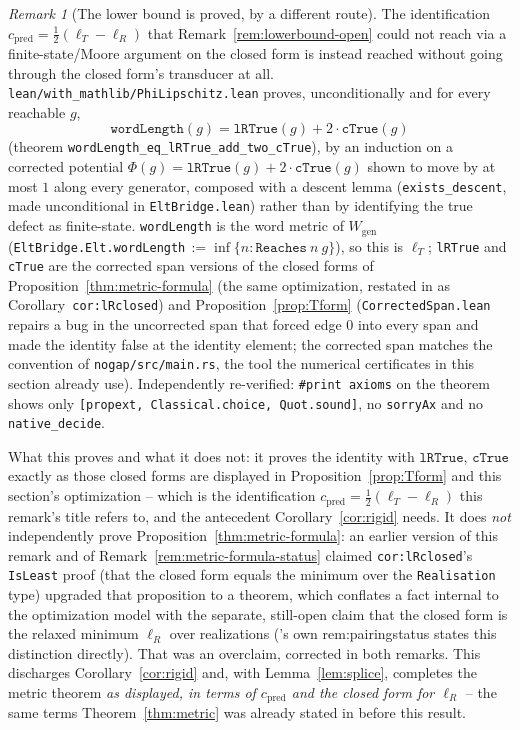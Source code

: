 \documentclass[11pt]{article}
\theoremstyle{plain}
\theoremstyle{definition}
\theoremstyle{remark}
\newtheorem{remark}[theorem]{Remark}
\begin{document}
\begin{remark}[The lower bound is proved, by a different route]
\label{rem:lowerbound-closed}
The identification $c_{\mathrm{pred}}=\tfrac12(\ell_T-\ell_R)$ that
Remark~\ref{rem:lowerbound-open} could not reach via a finite-state/Moore
argument on the closed form is instead reached without going through the
closed form's transducer at all. \texttt{lean/with\_mathlib/PhiLipschitz.lean}
proves, unconditionally and for every reachable $g$,
\[
\texttt{wordLength}(g)=\texttt{lRTrue}(g)+2\cdot\texttt{cTrue}(g)
\]
(theorem \texttt{wordLength\_eq\_lRTrue\_add\_two\_cTrue}), by an induction on
a corrected potential $\Phi(g)=\texttt{lRTrue}(g)+2\cdot\texttt{cTrue}(g)$
shown to move by at most $1$ along every generator, composed with a descent
lemma (\texttt{exists\_descent}, made unconditional in
\texttt{EltBridge.lean}) rather than by identifying the true defect as
finite-state. \texttt{wordLength} is the word metric of $W_{\mathrm{gen}}$
(\texttt{EltBridge.Elt.wordLength}$\,:=\inf\{n:\texttt{Reaches}\ n\ g\}$), so
this is $\ell_T$; \texttt{lRTrue} and \texttt{cTrue} are the corrected span
versions of the closed forms of Proposition~\ref{thm:metric-formula} (the same
optimization, restated in \cite{Bonfioli2026b} as Corollary~\texttt{cor:lRclosed})
and Proposition~\ref{prop:Tform} (\texttt{CorrectedSpan.lean} repairs a bug in the
uncorrected span that forced edge $0$ into every span and made the identity
false at the identity element; the corrected span matches the convention of
\texttt{nogap/src/main.rs}, the tool the numerical certificates in this
section already use). Independently re-verified: \texttt{\#print axioms} on
the theorem shows only \texttt{[propext, Classical.choice, Quot.sound]}, no
\texttt{sorryAx} and no \texttt{native\_decide}.

What this proves and what it does not: it proves the identity with
$\texttt{lRTrue}$, $\texttt{cTrue}$ exactly as those closed forms are displayed
in Proposition~\textup{\ref{prop:Tform}} and this section's optimization --
which is the identification $c_{\mathrm{pred}}=\tfrac12(\ell_T-\ell_R)$ this
remark's title refers to, and the antecedent Corollary~\ref{cor:rigid} needs.
It does \emph{not} independently prove Proposition~\ref{thm:metric-formula}: an
earlier version of this remark and of Remark~\ref{rem:metric-formula-status}
claimed \texttt{cor:lRclosed}'s \texttt{IsLeast} proof (that the closed form
equals the minimum over the \texttt{Realisation} type) upgraded that
proposition to a theorem, which conflates a fact internal to the optimization
model with the separate, still-open claim that the closed form is the
relaxed minimum $\ell_R$ over realizations (\cite{Bonfioli2026b}'s own \textup{rem:pairingstatus}
states this distinction directly). That was an overclaim, corrected in both
remarks. This discharges Corollary~\ref{cor:rigid} and, with
Lemma~\ref{lem:splice}, completes the metric theorem \emph{as displayed, in
terms of $c_{\mathrm{pred}}$ and the closed form for $\ell_R$} -- the same
terms Theorem~\ref{thm:metric} was already stated in before this result.
\end{remark}
\end{document}
